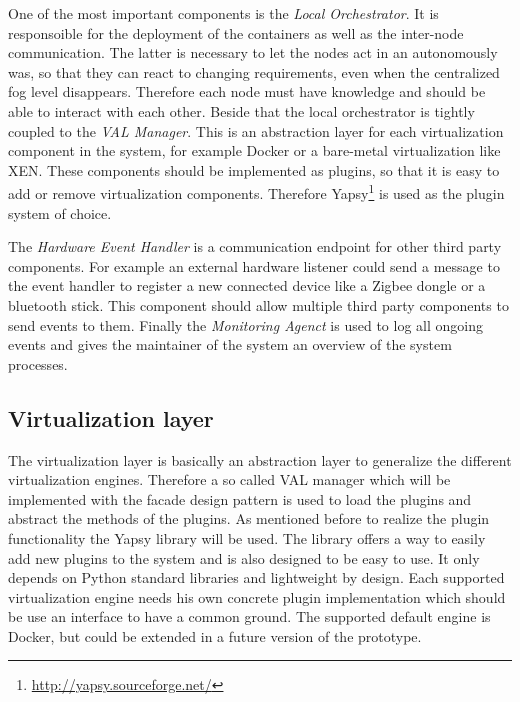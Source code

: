 One of the most important components is the \textit{Local Orchestrator}.
It is responsoible for the deployment of the containers as well as the inter-node communication.
The latter is necessary to let the nodes act in an autonomously was, so that they can react to changing requirements, even when the centralized fog level disappears.
Therefore each node must have knowledge and should be able to interact with each other.
Beside that the local orchestrator is tightly coupled to the \textit{\ac{VAL} Manager}.
This is an abstraction layer for each virtualization component in the system, for example Docker or a bare-metal virtualization like XEN.
These components should be implemented as plugins, so that it is easy to add or remove virtualization components.
Therefore Yapsy\footnote{\url{http://yapsy.sourceforge.net/}} is used as the plugin system of choice.

The \textit{Hardware Event Handler} is a communication endpoint for other third party components.
For example an external hardware listener could send a message to the event handler to register a new connected device like a Zigbee dongle or a bluetooth stick.
This component should allow multiple third party components to send events to them.
Finally the \textit{Monitoring Agenct} is used to log all ongoing events and gives the maintainer of the system an overview of the system processes.

\subsection{Virtualization layer}
The virtualization layer is basically an abstraction layer to generalize the different virtualization engines.
Therefore a so called \ac{VAL} manager which will be implemented with the facade design pattern is used to load the plugins and abstract the methods of the plugins.
As mentioned before to realize the plugin functionality the Yapsy library will be used.
The library offers a way to easily add new plugins to the system and is also designed to be easy to use.
It only depends on Python standard libraries and lightweight by design.
Each supported virtualization engine needs his own concrete plugin implementation which should be use an interface to have a common ground.
The supported default engine is Docker, but could be extended in a future version of the prototype.

